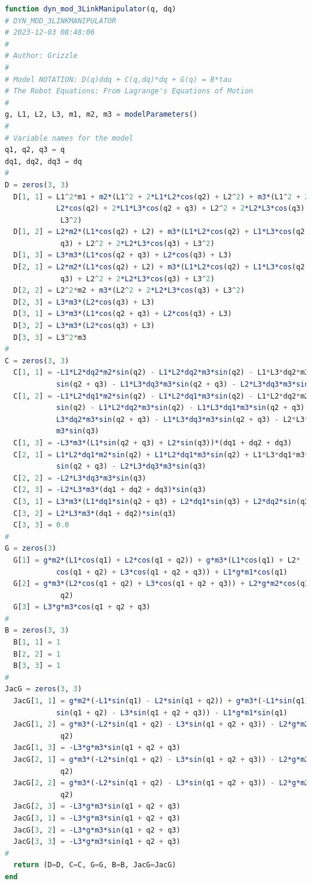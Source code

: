\begin{lstlisting}[language=Julia,style=mystyle]
function dyn_mod_3LinkManipulator(q, dq)
# DYN_MOD_3LINKMANIPULATOR
# 2023-12-03 08:48:06
#
# Author: Grizzle
#
# Model NOTATION: D(q)ddq + C(q,dq)*dq + G(q) = B*tau 
# The Robot Equations: From Lagrange's Equations of Motion
#
g, L1, L2, L3, m1, m2, m3 = modelParameters()
#
# Variable names for the model
q1, q2, q3 = q 
dq1, dq2, dq3 = dq
#
D = zeros(3, 3)
  D[1, 1] = L1^2*m1 + m2*(L1^2 + 2*L1*L2*cos(q2) + L2^2) + m3*(L1^2 + 2*L1*
            L2*cos(q2) + 2*L1*L3*cos(q2 + q3) + L2^2 + 2*L2*L3*cos(q3) +
             L3^2)
  D[1, 2] = L2*m2*(L1*cos(q2) + L2) + m3*(L1*L2*cos(q2) + L1*L3*cos(q2 +
             q3) + L2^2 + 2*L2*L3*cos(q3) + L3^2)
  D[1, 3] = L3*m3*(L1*cos(q2 + q3) + L2*cos(q3) + L3)
  D[2, 1] = L2*m2*(L1*cos(q2) + L2) + m3*(L1*L2*cos(q2) + L1*L3*cos(q2 +
             q3) + L2^2 + 2*L2*L3*cos(q3) + L3^2)
  D[2, 2] = L2^2*m2 + m3*(L2^2 + 2*L2*L3*cos(q3) + L3^2)
  D[2, 3] = L3*m3*(L2*cos(q3) + L3)
  D[3, 1] = L3*m3*(L1*cos(q2 + q3) + L2*cos(q3) + L3)
  D[3, 2] = L3*m3*(L2*cos(q3) + L3)
  D[3, 3] = L3^2*m3
#
C = zeros(3, 3)
  C[1, 1] = -L1*L2*dq2*m2*sin(q2) - L1*L2*dq2*m3*sin(q2) - L1*L3*dq2*m3*
            sin(q2 + q3) - L1*L3*dq3*m3*sin(q2 + q3) - L2*L3*dq3*m3*sin(q3)
  C[1, 2] = -L1*L2*dq1*m2*sin(q2) - L1*L2*dq1*m3*sin(q2) - L1*L2*dq2*m2*
            sin(q2) - L1*L2*dq2*m3*sin(q2) - L1*L3*dq1*m3*sin(q2 + q3) - L1*
            L3*dq2*m3*sin(q2 + q3) - L1*L3*dq3*m3*sin(q2 + q3) - L2*L3*dq3*
            m3*sin(q3)
  C[1, 3] = -L3*m3*(L1*sin(q2 + q3) + L2*sin(q3))*(dq1 + dq2 + dq3)
  C[2, 1] = L1*L2*dq1*m2*sin(q2) + L1*L2*dq1*m3*sin(q2) + L1*L3*dq1*m3*
            sin(q2 + q3) - L2*L3*dq3*m3*sin(q3)
  C[2, 2] = -L2*L3*dq3*m3*sin(q3)
  C[2, 3] = -L2*L3*m3*(dq1 + dq2 + dq3)*sin(q3)
  C[3, 1] = L3*m3*(L1*dq1*sin(q2 + q3) + L2*dq1*sin(q3) + L2*dq2*sin(q3))
  C[3, 2] = L2*L3*m3*(dq1 + dq2)*sin(q3)
  C[3, 3] = 0.0
#
G = zeros(3)
  G[1] = g*m2*(L1*cos(q1) + L2*cos(q1 + q2)) + g*m3*(L1*cos(q1) + L2*
            cos(q1 + q2) + L3*cos(q1 + q2 + q3)) + L1*g*m1*cos(q1)
  G[2] = g*m3*(L2*cos(q1 + q2) + L3*cos(q1 + q2 + q3)) + L2*g*m2*cos(q1 +
             q2)
  G[3] = L3*g*m3*cos(q1 + q2 + q3)
#
B = zeros(3, 3)
  B[1, 1] = 1
  B[2, 2] = 1
  B[3, 3] = 1
#
JacG = zeros(3, 3)
  JacG[1, 1] = g*m2*(-L1*sin(q1) - L2*sin(q1 + q2)) + g*m3*(-L1*sin(q1) - L2*
            sin(q1 + q2) - L3*sin(q1 + q2 + q3)) - L1*g*m1*sin(q1)
  JacG[1, 2] = g*m3*(-L2*sin(q1 + q2) - L3*sin(q1 + q2 + q3)) - L2*g*m2*sin(q1 +
             q2)
  JacG[1, 3] = -L3*g*m3*sin(q1 + q2 + q3)
  JacG[2, 1] = g*m3*(-L2*sin(q1 + q2) - L3*sin(q1 + q2 + q3)) - L2*g*m2*sin(q1 +
             q2)
  JacG[2, 2] = g*m3*(-L2*sin(q1 + q2) - L3*sin(q1 + q2 + q3)) - L2*g*m2*sin(q1 +
             q2)
  JacG[2, 3] = -L3*g*m3*sin(q1 + q2 + q3)
  JacG[3, 1] = -L3*g*m3*sin(q1 + q2 + q3)
  JacG[3, 2] = -L3*g*m3*sin(q1 + q2 + q3)
  JacG[3, 3] = -L3*g*m3*sin(q1 + q2 + q3)
#
  return (D=D, C=C, G=G, B=B, JacG=JacG)
end
\end{lstlisting}

